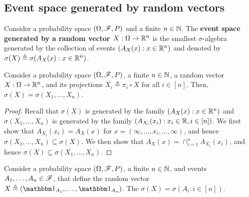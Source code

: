 \documentclass[letterpaper,10pt,english]{article}
\begin{document}
\subsection{Event space generated by random vectors}
\begin{defn} %
Consider a probability space $(\Omega, \mathscr{F}, P)$ and a finite $n \in \mathbb{N}$.  
The \textbf{event space generated by a random vector $X:\Omega \to \mathbb{R}^n$} is the smallest $\sigma$-algebra generated by the collection of events $(A_X(x): x \in \mathbb{R}^n)$ and denoted by $\sigma(X) \triangleq \sigma(A_X(x):x \in \mathbb{R}^n)$.  
\end{defn}
\begin{thm}
Consider a probability space $(\Omega, \mathscr{F}, P)$, a finite $n \in \mathbb{N}$, 
a random vector $X: \Omega \to \mathbb{R}^n$, and its projections $X_i \triangleq \pi_i \circ X$ for all $i \in [n]$. 
Then, $\sigma(X) = \sigma(X_1, \dots, X_n)$.   
\end{thm}
\begin{proof}
Recall that $\sigma(X)$ is generated by the family $(A_X(x): x \in \mathbb{R}^n)$ and $\sigma(X_1, \dots, X_n)$ is generated by the family $(A_{X_i}(x_i): x_i \in \mathbb{R}, i \in [n])$. 
We first show that $A_{X_i}(x_i) = A_X(x)$ for $x = (\infty, \dots, x_i, \dots, \infty)$, and hence $\sigma(X_1, \dots, X_n) \subseteq \sigma(X)$. 
We then show that $A_X(x) = \cap_{i=1}^nA_{X_i}(x_i)$, and hence $\sigma(X) \subseteq \sigma(X_1, \dots, X_n)$. 
\end{proof}
\begin{shaded}
\begin{exmp} 
Consider a probability space $(\Omega, \mathscr{F}, P)$, a finite $n \in \mathbb{N}$, and events $A_1, \dots, A_n \in \mathscr{F}$, 
that define the random vector $X \triangleq (\Ind{A_1}, \dots, \Ind{A_n})$. 
The $\sigma(X) = \sigma(A_i: i \in [n])$. 
\end{exmp}
\end{shaded}
\end{document}

